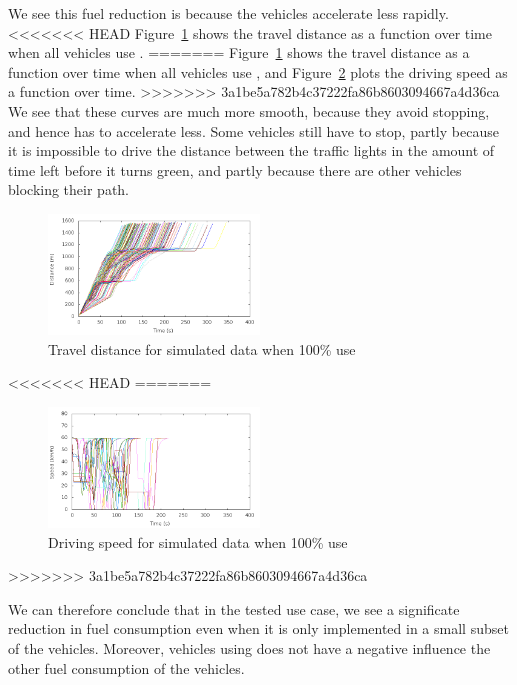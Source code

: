 We see this fuel reduction is because the vehicles accelerate less rapidly. 
<<<<<<< HEAD
Figure~\ref{fig:TestResults:distance100} shows the travel distance as a function over time when all vehicles use \tech. 
=======
Figure~\ref{fig:TestResults:distance100} shows the travel distance as a function over time when all vehicles use \tech, and Figure~\ref{fig:TestResults:speed100} plots the driving speed as a function over time.
>>>>>>> 3a1be5a782b4c37222fa86b8603094667a4d36ca
We see that these curves are much more smooth, because they avoid stopping, and hence has to accelerate less.
Some vehicles still have to stop, partly because it is impossible to drive the distance between the traffic lights in the amount of time left before it turns green, and partly because there are other vehicles blocking their path.
\begin{figure}[htb]
\includegraphics[width=0.5\textwidth]{../images/tp0c1_0/distanceControlled100.png}
\caption{Travel distance for simulated data when 100\% use \tech}
\label{fig:TestResults:distance100}
\end{figure}
<<<<<<< HEAD
=======
\begin{figure}[htb]
\includegraphics[width=0.5\textwidth]{../images/tp0c1_0/speedControlled100.png}
\caption{Driving speed for simulated data when 100\% use \tech}
\label{fig:TestResults:speed100}
\end{figure}
>>>>>>> 3a1be5a782b4c37222fa86b8603094667a4d36ca

We can therefore conclude that in the tested use case, we see a significate reduction in fuel consumption even when it is only implemented in a small subset of the vehicles. 
Moreover, vehicles using \tech does not have a negative influence the other fuel consumption of the vehicles.

